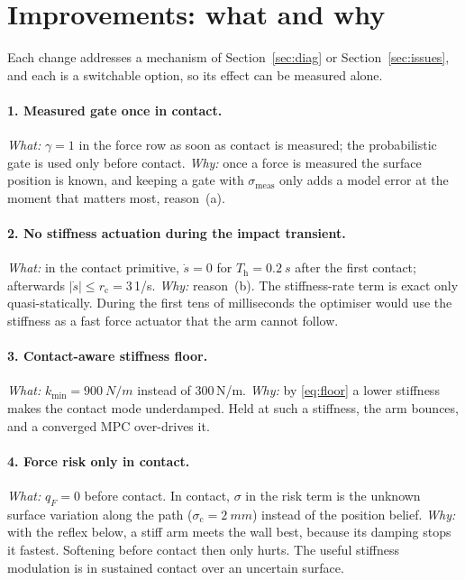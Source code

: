 \documentclass[11pt,a4paper]{article}
\begin{document}
\section{Improvements: what and why}\label{sec:v2}

Each change addresses a mechanism of Section~\ref{sec:diag} or Section~\ref{sec:issues}, and each is a
switchable option, so its effect can be measured alone.

\paragraph{1. Measured gate once in contact.}
\emph{What:} $\gamma=1$ in the force row as soon as contact is measured; the probabilistic gate is used only
before contact. \emph{Why:} once a force is measured the surface position is known, and keeping a gate
with $\sigma_\mathrm{meas}$ only adds a model error at the moment that matters most, reason~(a).

\paragraph{2. No stiffness actuation during the impact transient.}
\emph{What:} in the contact primitive, $\dot s=0$ for $T_\mathrm{h}=\SI{0.2}{s}$ after the first contact;
afterwards $|\dot s|\le r_\mathrm{c}=3$\,1/s. \emph{Why:} reason~(b). The stiffness-rate term is exact only
quasi-statically. During the first tens of milliseconds the optimiser would use the stiffness as a fast
force actuator that the arm cannot follow.

\paragraph{3. Contact-aware stiffness floor.}
\emph{What:} $k_\mathrm{min}=\SI{900}{N/m}$ instead of 300\,N/m. \emph{Why:} by \eqref{eq:floor} a lower
stiffness makes the contact mode underdamped. Held at such a stiffness, the arm bounces, and a converged
MPC over-drives it.

\paragraph{4. Force risk only in contact.}
\emph{What:} $q_F=0$ before contact. In contact, $\sigma$ in the risk term is the unknown surface variation
along the path ($\sigma_\mathrm{c}=\SI{2}{mm}$) instead of the position belief. \emph{Why:} with the
reflex below, a stiff arm meets the wall best, because its damping stops it fastest. Softening before
contact then only hurts. The useful stiffness modulation is in sustained contact over an uncertain surface.
\end{document}
